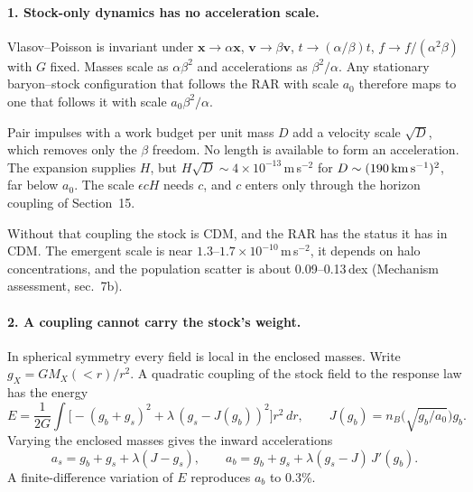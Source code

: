 \paragraph{1. Stock-only dynamics has no acceleration scale.}
Vlasov--Poisson is invariant under $\mathbf x\to\alpha\mathbf x$, $\mathbf v\to\beta\mathbf v$, $t\to(\alpha/\beta)t$, $f\to f/(\alpha^2\beta)$ with $G$ fixed. Masses scale as $\alpha\beta^2$ and accelerations as $\beta^2/\alpha$. Any stationary baryon--stock configuration that follows the RAR with scale $a_0$ therefore maps to one that follows it with scale $a_0\beta^2/\alpha$.

Pair impulses with a work budget per unit mass $D$ add a velocity scale $\sqrt D$, which removes only the $\beta$ freedom. No length is available to form an acceleration. The expansion supplies $H$, but $H\sqrt D\sim4\times10^{-13}$\,m\,s$^{-2}$ for $D\sim(190\,{\rm km\,s^{-1}})^2$, far below $a_0$. The scale $\epsilon cH$ needs $c$, and $c$ enters only through the horizon coupling of Section~15.

Without that coupling the stock is CDM, and the RAR has the status it has in CDM. The emergent scale is near $1.3$--$1.7\times10^{-10}$\,m\,s$^{-2}$, it depends on halo concentrations, and the population scatter is about 0.09--0.13\,dex (Mechanism assessment, sec.~7b).

\paragraph{2. A coupling cannot carry the stock's weight.}
In spherical symmetry every field is local in the enclosed masses. Write $g_X=GM_X(<r)/r^2$. A quadratic coupling of the stock field to the response law has the energy
\begin{equation}
E=\frac1{2G}\int\Big[-(g_b+g_s)^2+\lambda\,(g_s-J(g_b))^2\Big]r^2\,dr,
\qquad J(g_b)=n_B\big(\sqrt{g_b/a_0}\big)g_b .
\end{equation}
Varying the enclosed masses gives the inward accelerations
\begin{equation}
a_s=g_b+g_s+\lambda(J-g_s),\qquad
a_b=g_b+g_s+\lambda(g_s-J)\,J'(g_b).
\end{equation}
A finite-difference variation of $E$ reproduces $a_b$ to 0.3\%.

